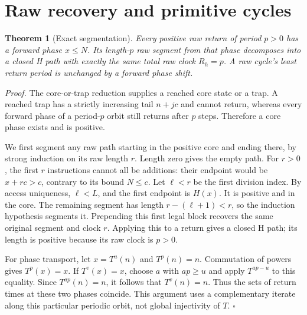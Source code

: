 \documentclass[11pt,letterpaper]{article}
\newtheorem{theorem}{Theorem}
\newenvironment{proof}{\noindent\textit{Proof.}}{\hfill\(\square\)}
\begin{document}
\section{Raw recovery and primitive cycles}

\begin{theorem}[Exact segmentation]
\label{thm:segmentation}
Every positive raw return of period $p>0$ has a forward phase $x\le N$.
Its length-$p$ raw segment from that phase decomposes into a closed H path
with exactly the same total raw clock $R_h=p$.
A raw cycle's least return period is unchanged by a forward phase shift.
\end{theorem}
\begin{proof}
The core-or-trap reduction supplies a reached core state or a trap. A reached
trap has a strictly increasing tail $n+jc$ and cannot return, whereas every
forward phase of a period-$p$ orbit still returns after $p$ steps. Therefore
a core phase exists and is positive.

We first segment any raw path starting in the positive core and ending there,
by strong induction on its raw length $r$. Length zero gives the empty path.
For $r>0$, the first $r$ instructions cannot all be additions: their endpoint
would be $x+rc>c$, contrary to its bound $N\le c$. Let $\ell<r$ be the first
division index. By access uniqueness, $\ell<L$, and the first endpoint is
$H(x)$. It is positive and in the core. The remaining segment has length
$r-(\ell+1)<r$, so the induction hypothesis segments it. Prepending this
first legal block recovers the same original segment and clock $r$.
Applying this to a return gives a closed H path; its length is positive
because its raw clock is $p>0$.

For phase transport, let $x=T^u(n)$ and $T^p(n)=n$. Commutation of powers
gives $T^p(x)=x$. If $T^v(x)=x$, choose $a$ with $ap\ge u$ and apply
$T^{ap-u}$ to this equality. Since $T^{ap}(n)=n$, it follows that
$T^v(n)=n$. Thus the sets of return times at these two phases coincide.
This argument uses a complementary iterate along this particular periodic
orbit, not global injectivity of $T$.
\end{proof}
\end{document}
